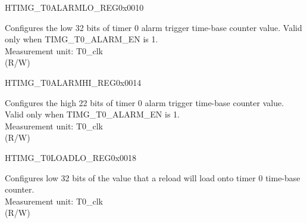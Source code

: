 \begin{register}{H}{TIMG\_T0ALARMLO\_REG}{0x0010}\label{regdesc:TIMGTXALARMLOREG}
%
\regnewline%
\begin{regdesc}\begin{reglist}
\label{fielddesc:TIMGTXALARMLO}\item [TIMG\_T0\_ALARM\_LO] Configures the low 32 bits of timer 0 alarm trigger time-base counter value. Valid only when TIMG\_T0\_ALARM\_EN is 1. \\
Measurement unit: T0\_clk \\ (R/W)
\end{reglist}\end{regdesc}
\end{register}


\begin{register}{H}{TIMG\_T0ALARMHI\_REG}{0x0014}\label{regdesc:TIMGTXALARMHIREG}
%
%
\regnewline%
\begin{regdesc}\begin{reglist}
\label{fielddesc:TIMGTXALARMHI}\item [TIMG\_T0\_ALARM\_HI] Configures the high 22 bits of timer 0 alarm trigger time-base counter value. Valid only when TIMG\_T0\_ALARM\_EN is 1. \\
Measurement unit: T0\_clk \\ (R/W)
\end{reglist}\end{regdesc}
\end{register}


\begin{register}{H}{TIMG\_T0LOADLO\_REG}{0x0018}\label{regdesc:TIMGTXLOADLOREG}
%
\regnewline%
\begin{regdesc}\begin{reglist}
\label{fielddesc:TIMGTXLOADLO}\item [TIMG\_T0\_LOAD\_LO] Configures low 32 bits of the value that a reload will load onto timer 0 time-base counter. \\
Measurement unit: T0\_clk \\ (R/W)
\end{reglist}\end{regdesc}
\end{register}


